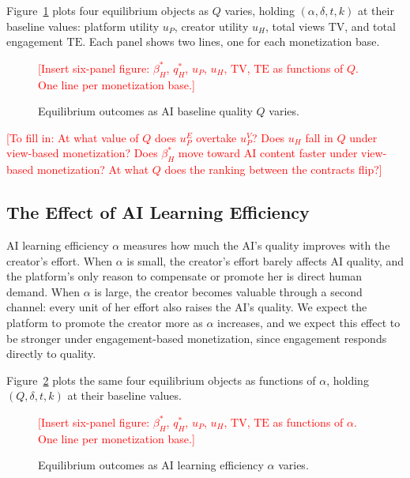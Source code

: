 Figure~\ref{fig:Q-comparative-statics} plots four equilibrium objects
as $Q$ varies, holding $(\alpha,\delta,t,k)$ at their baseline values: platform
utility $u_P$, creator utility $u_H$, total views $\mathrm{TV}$, and
total engagement $\mathrm{TE}$. Each panel shows two lines, one for
each monetization base.

\begin{figure}[ht]
\centering
\textcolor{red}{[Insert six-panel figure: $\beta_H^*$, $q_H^*$, $u_P$,
$u_H$, $\mathrm{TV}$, $\mathrm{TE}$ as functions of $Q$. One line per
monetization base.]}
\caption{Equilibrium outcomes as AI baseline quality $Q$ varies.}
\label{fig:Q-comparative-statics}
\end{figure}

\textcolor{red}{[To fill in: At what value of $Q$ does $u_P^E$ overtake
$u_P^V$? Does $u_H$ fall in $Q$ under view-based monetization? Does
$\beta_H^*$ move toward AI content faster under view-based
monetization? At what $Q$ does the ranking between the contracts
flip?]}

\subsection{The Effect of AI Learning Efficiency}
\label{subsec:numerics-alpha}

AI learning efficiency $\alpha$ measures how much the AI's quality
improves with the creator's effort. When $\alpha$ is small, the
creator's effort barely affects AI quality, and the platform's only
reason to compensate or promote her is direct human demand. When
$\alpha$ is large, the creator becomes valuable through a second
channel: every unit of her effort also raises the AI's quality. We
expect the platform to promote the creator more as $\alpha$ increases, and we expect this effect to be stronger under
engagement-based monetization, since engagement responds directly to
quality.

Figure~\ref{fig:alpha-comparative-statics} plots the same four
equilibrium objects as functions of $\alpha$, holding $(Q,\delta,t,k)$
at their baseline values.

\begin{figure}[ht]
\centering
\textcolor{red}{[Insert six-panel figure: $\beta_H^*$, $q_H^*$, $u_P$,
$u_H$, $\mathrm{TV}$, $\mathrm{TE}$ as functions of $\alpha$. One line
per monetization base.]}
\caption{Equilibrium outcomes as AI learning efficiency $\alpha$
varies.}
\label{fig:alpha-comparative-statics}
\end{figure}


